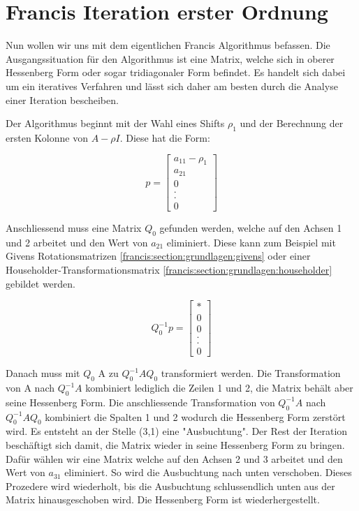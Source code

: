 \section{Francis Iteration erster Ordnung\label{francis:section:francis_iteration}}

Nun wollen wir uns mit dem eigentlichen Francis Algorithmus \cite{francis:watkins_book} befassen.
Die Ausgangssituation für den Algorithmus ist eine Matrix, welche sich in oberer Hessenberg Form oder sogar tridiagonaler Form befindet.
Es handelt sich dabei um ein iteratives Verfahren und lässt sich daher am besten durch die Analyse einer Iteration bescheiben.

Der Algorithmus beginnt mit der Wahl eines Shifts $\rho_{1}$ und der Berechnung der ersten Kolonne von $A-\rho I$. 
Diese hat die Form:

\begin{equation}
	p=\begin{bmatrix}
	a_{11}-\rho_{1}\\
	a_{21}\\
	0\\
	.\\
	.\\
	0
	\end{bmatrix}
\end{equation}

Anschliessend muss eine Matrix $Q_{0}$ gefunden werden, welche auf den Achsen 1 und 2 arbeitet und den Wert von $a_{21}$ eliminiert. Diese kann zum Beispiel mit Givens Rotationsmatrizen \ref{francis:section:grundlagen:givens} oder einer Householder-Transformationsmatrix \ref{francis:section:grundlagen:householder} gebildet werden.

\begin{equation}
	Q_{0}^{-1}p=\begin{bmatrix}
	*\\
	0\\
	0\\
	.\\
	.\\
	0
	\end{bmatrix}
\end{equation}

Danach muss mit $Q_{0}$ A zu  $Q_{0}^{-1}AQ_{0}$ transformiert werden.
Die Transformation von A nach $Q_{0}^{-1}A$ kombiniert lediglich die Zeilen 1 und 2, die Matrix behält aber seine Hessenberg Form.
Die anschliessende Transformation von $Q_{0}^{-1}A$ nach $Q_{0}^{-1}AQ_{0}$ kombiniert die Spalten 1 und 2 wodurch die Hessenberg Form zerstört wird.
Es entsteht an der Stelle (3,1) eine "Ausbuchtung".
Der Rest der Iteration beschäftigt sich damit, die Matrix wieder in seine Hessenberg Form zu bringen.
Dafür wählen wir eine Matrix welche auf den Achsen 2 und 3 arbeitet und den Wert von $a_{31}$ eliminiert.
So wird die Ausbuchtung nach unten verschoben.
Dieses Prozedere wird wiederholt, bis die Ausbuchtung schlussendlich unten aus der Matrix hinausgeschoben wird.
Die Hessenberg Form ist wiederhergestellt.

